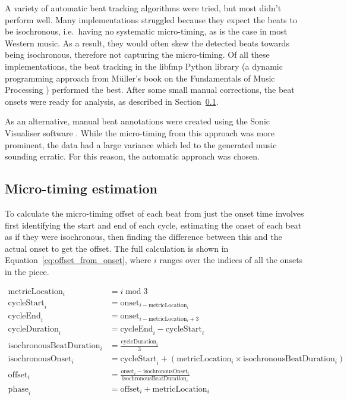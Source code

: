 \documentclass[12pt,twoside,openright]{report}
\begin{document}
A variety of automatic beat tracking algorithms were tried, but most didn't
perform well. Many implementations struggled because they expect the beats to be
isochronous, i.e.\ having no systematic micro-timing, as is the case in most
Western music. As a result, they would often skew the detected beats towards
being isochronous, therefore not capturing the micro-timing. Of all these
implementations, the beat tracking in the libfmp Python library \cite{mueller2021} (a
dynamic programming approach from Müller's book on the Fundamentals of Music Processing
\cite{mueller2021b}) performed the best. After some
small manual corrections, the beat onsets were ready for analysis, as described
in Section~\ref{waltz_micro-timing}.

As an alternative, manual beat annotations were created using the Sonic
Visualiser software \cite{cannam2010}. While the micro-timing from this approach was
more prominent, the data had a large variance which led to the generated music
sounding erratic. For this reason, the automatic approach was chosen.


\subsection{Micro-timing estimation} \label{waltz_micro-timing}

To calculate the micro-timing offset of each beat from just the onset time
involves first identifying the start and end of each cycle, estimating the onset
of each beat as if they were isochronous, then finding the difference between this
and the actual onset to get the offset. The full calculation is shown in
Equation~\ref{eq:offset_from_onset}, where $i$ ranges over the indices of all the onsets in the piece.

\begin{equation}
\begin{split}
    \mathrm{metricLocation}_i &= i \;\mathrm{mod}\; 3 \\
    \mathrm{cycleStart}_i     &= \mathrm{onset}_{i-\mathrm{metricLocation}_i} \\
    \mathrm{cycleEnd}_i       &= \mathrm{onset}_{i-\mathrm{metricLocation}_i+3} \\
    \mathrm{cycleDuration}_i  &= \mathrm{cycleEnd}_i - \mathrm{cycleStart}_i \\
    \mathrm{isochronousBeatDuration}_i &= \frac{\mathrm{cycleDuration}_i}{3} \\
    \mathrm{isochronousOnset}_i &= \mathrm{cycleStart}_i + (\mathrm{metricLocation}_i \times \mathrm{isochronousBeatDuration}_i) \\
    \mathrm{offset}_i &= \frac{\mathrm{onset}_i-\mathrm{isochronousOnset}_i}{\mathrm{isochronousBeatDuration}_i} \\
    \mathrm{phase}_i          &= \mathrm{offset}_i + \mathrm{metricLocation}_i
\end{split}
\label{eq:offset_from_onset}
\end{equation}
\end{document}
